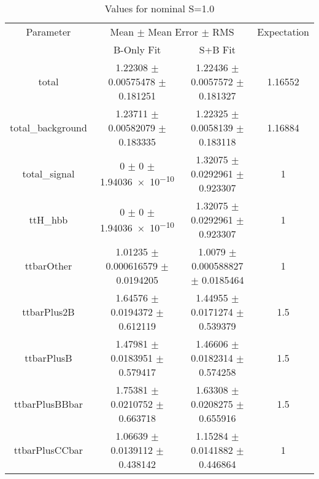 \begin{table}
\centering
\caption{Values for nominal S=1.0}
\begin{tabular}{cccc}
\toprule
Parameter & \multicolumn{2}{c}{Mean $\pm$ Mean Error $\pm$ RMS} & Expectation\\
 & B-Only Fit & S+B Fit & \\
\midrule
total & \num{1.22308} $\pm$ \num{0.00575478} $\pm$ \num{0.181251} & \num{1.22436} $\pm$ \num{0.0057572} $\pm$ \num{0.181327} & \num{1.16552}\\
total\_background & \num{1.23711} $\pm$ \num{0.00582079} $\pm$ \num{0.183335} & \num{1.22325} $\pm$ \num{0.0058139} $\pm$ \num{0.183118} & \num{1.16884}\\
total\_signal & \num{0} $\pm$ \num{0} $\pm$ \num{1.94036e-10} & \num{1.32075} $\pm$ \num{0.0292961} $\pm$ \num{0.923307} & \num{1}\\
ttH\_hbb & \num{0} $\pm$ \num{0} $\pm$ \num{1.94036e-10} & \num{1.32075} $\pm$ \num{0.0292961} $\pm$ \num{0.923307} & \num{1}\\
ttbarOther & \num{1.01235} $\pm$ \num{0.000616579} $\pm$ \num{0.0194205} & \num{1.0079} $\pm$ \num{0.000588827} $\pm$ \num{0.0185464} & \num{1}\\
ttbarPlus2B & \num{1.64576} $\pm$ \num{0.0194372} $\pm$ \num{0.612119} & \num{1.44955} $\pm$ \num{0.0171274} $\pm$ \num{0.539379} & \num{1.5}\\
ttbarPlusB & \num{1.47981} $\pm$ \num{0.0183951} $\pm$ \num{0.579417} & \num{1.46606} $\pm$ \num{0.0182314} $\pm$ \num{0.574258} & \num{1.5}\\
ttbarPlusBBbar & \num{1.75381} $\pm$ \num{0.0210752} $\pm$ \num{0.663718} & \num{1.63308} $\pm$ \num{0.0208275} $\pm$ \num{0.655916} & \num{1.5}\\
ttbarPlusCCbar & \num{1.06639} $\pm$ \num{0.0139112} $\pm$ \num{0.438142} & \num{1.15284} $\pm$ \num{0.0141882} $\pm$ \num{0.446864} & \num{1}\\
\bottomrule
\end{tabular}
\end{table}